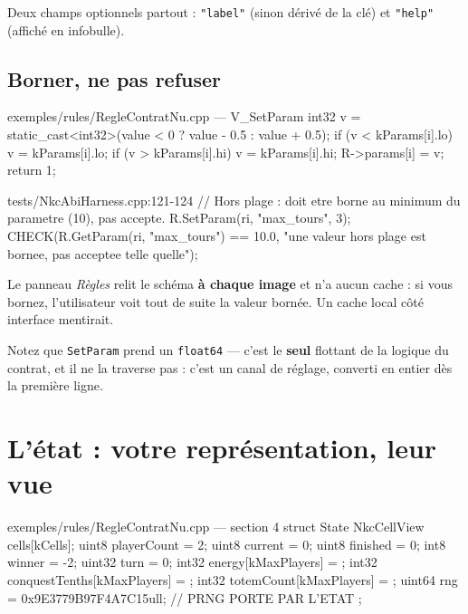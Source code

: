 Deux champs optionnels partout : \texttt{"label"} (sinon dérivé de la clé) et
\texttt{"help"} (affiché en infobulle).

\subsection{Borner, ne pas refuser}

\begin{nkcode}{exemples/rules/RegleContratNu.cpp — V\_SetParam}
int32 v = static_cast<int32>(value < 0 ? value - 0.5 : value + 0.5);
if (v < kParams[i].lo) v = kParams[i].lo;
if (v > kParams[i].hi) v = kParams[i].hi;
R->params[i] = v;
return 1;
\end{nkcode}

\begin{nkretenir}
\begin{nkcode}{tests/NkcAbiHarness.cpp:121-124}
// Hors plage : doit etre borne au minimum du parametre (10), pas accepte.
R.SetParam(ri, "max_tours", 3);
CHECK(R.GetParam(ri, "max_tours") == 10.0,
      "une valeur hors plage est bornee, pas acceptee telle quelle");
\end{nkcode}
Le panneau \emph{Règles} relit le schéma \textbf{à chaque image} et n'a aucun
cache : si vous bornez, l'utilisateur voit tout de suite la valeur bornée. Un
cache local côté interface mentirait.
\end{nkretenir}

Notez que \texttt{SetParam} prend un \texttt{float64} — c'est le \textbf{seul}
flottant de la logique du contrat, et il ne la traverse pas : c'est un canal de
réglage, converti en entier dès la première ligne.

\section{L'état : votre représentation, leur vue}

\begin{nkcode}{exemples/rules/RegleContratNu.cpp — section 4}
struct State {
        NkcCellView cells[kCells];
        uint8       playerCount = 2;
        uint8       current     = 0;
        uint8       finished    = 0;
        int8        winner      = -2;
        uint32      turn        = 0;
        int32       energy[kMaxPlayers]         = {};
        int32       conquestTenths[kMaxPlayers] = {};
        int32       totemCount[kMaxPlayers]     = {};
        uint64      rng = 0x9E3779B97F4A7C15ull;   // PRNG PORTE PAR L'ETAT
};
\end{nkcode}

